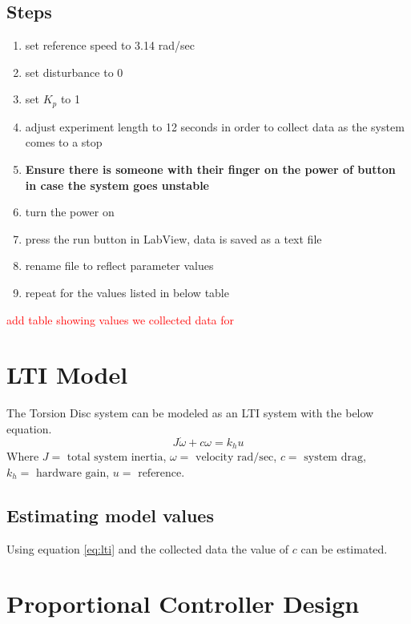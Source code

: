 \documentclass[11pt,titlepage]{article}
\begin{document}
	\subsection*{Steps}
		\begin{enumerate}
			\item set reference speed to 3.14 rad/sec
			\item set disturbance to 0
			\item set $K_p$ to 1
			\item adjust experiment length to 12 seconds in order to collect data as the system comes to a stop
			\item \textbf{Ensure there is someone with their finger on the power of button in case the system goes unstable}
			\item turn the power on
			\item press the run button in LabView, data is saved as a text file
			\item rename file to reflect parameter values
			\item repeat for the values listed in below table
		\end{enumerate}
		\textcolor{red}{add table showing values we collected data for}

\section{LTI Model} \label{sec:LTI}
	The Torsion Disc system can be modeled as an LTI system with the below equation.
	\begin{equation} \label{eq:lti}
		J\dot{\omega}+c\omega=k_hu
	\end{equation}
	Where $J=\mbox{ total system inertia}$, $\omega=\mbox{ velocity rad/sec}$, $c=\mbox{ system drag}$, $k_h=\mbox{ hardware gain}$, $u=\mbox{ reference}$.

	\subsection{Estimating model values}
	Using equation \ref{eq:lti} and the collected data the value of $c$ can be estimated.

\section{Proportional Controller Design}
\end{document}
